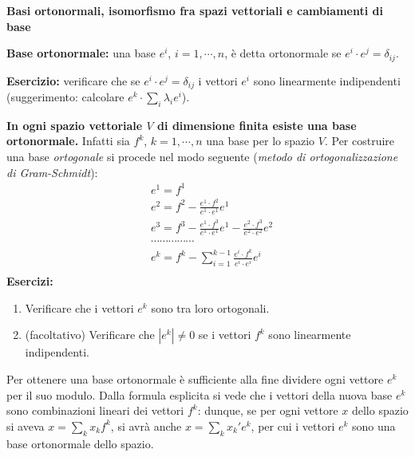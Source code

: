 \documentclass[a4paper,10pt]{article}
\newcommand{\linea}{\vskip14pt \noindent}
\begin{document}
\newpage

\centerline{\bf Basi ortonormali, isomorfismo fra spazi vettoriali e cambiamenti di base}

\linea
{\bf Base ortonormale:} una base $e^i$, $i=1,\cdots,n$, \`e detta ortonormale se
$e^i \cdot e^j = \delta_{ij}$. 

\linea
{\bf Esercizio:} verificare che se $e^i \cdot e^j = \delta_{ij}$ i vettori $e^i$ sono linearmente indipendenti
(suggerimento: calcolare $e^k \cdot \sum_i \lambda_i e^i$). 

\linea
{\bf In ogni spazio vettoriale $V$ di dimensione finita esiste una base ortonormale.}
\vskip5pt
\noindent
Infatti sia $f^k$, $k=1,\cdots,n$ una base per lo spazio $V$. Per costruire una base {\it ortogonale}
si procede nel modo seguente ({\it metodo di ortogonalizzazione di Gram-Schmidt}):
\begin{equation*}
\begin{split}
&e^1=f^1   \\
&e^2=f^2 - \frac{e^1 \cdot f^2}{e^1 \cdot e^1} e^1 \\
&e^3=f^3 - \frac{e^1 \cdot f^3}{e^1 \cdot e^1} e^1- \frac{e^2 \cdot f^3}{e^2 \cdot e^2} e^2 \\
&\cdots \cdots \cdots \cdots \cdots  \\
&e^k=f^k - \sum_{i=1}^{k-1} \frac{e^i \cdot f^k}{e^i \cdot e^i} e^i \\
\end{split} 
\end{equation*}
{\bf Esercizi:}
\begin{enumerate}
\item Verificare che i vettori $e^k$ sono tra loro ortogonali.
\item (facoltativo) Verificare che $|e^k|\neq 0$ se i vettori $f^k$ sono linearmente indipendenti.
\end{enumerate}
Per ottenere una base ortonormale \`e sufficiente alla fine dividere ogni vettore $e^k$ per il suo modulo.
Dalla formula esplicita si vede che i vettori della nuova base $e^k$ sono combinazioni lineari dei
vettori $f^k$: dunque, se per ogni vettore $x$ dello spazio si aveva $x=\sum_k x_k f^k$, si avr\`a anche
$x=\sum_k x_k'e^k$, per cui i vettori $e^k$ sono una base ortonormale dello spazio.
\end{document}
